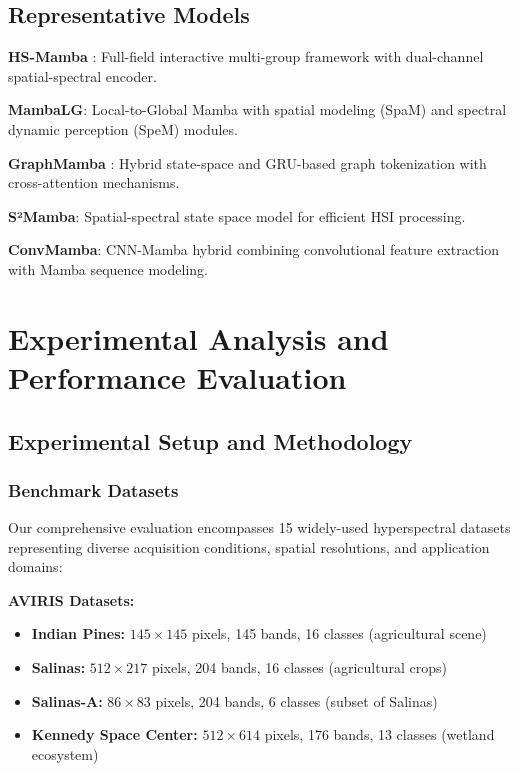 \documentclass[journal]{IEEEtran}
\begin{document}
\subsection{Representative Models}

\textbf{HS-Mamba} \cite{zhu2024mambahsi}: Full-field interactive multi-group framework with dual-channel spatial-spectral encoder.

\textbf{MambaLG}: Local-to-Global Mamba with spatial modeling (SpaM) and spectral dynamic perception (SpeM) modules.

\textbf{GraphMamba} \cite{ahmad2021graphmamba}: Hybrid state-space and GRU-based graph tokenization with cross-attention mechanisms.

\textbf{S²Mamba}: Spatial-spectral state space model for efficient HSI processing.

\textbf{ConvMamba}: CNN-Mamba hybrid combining convolutional feature extraction with Mamba sequence modeling.





\section{Experimental Analysis and Performance Evaluation}

\subsection{Experimental Setup and Methodology}

\subsubsection{Benchmark Datasets}

Our comprehensive evaluation encompasses 15 widely-used hyperspectral datasets representing diverse acquisition conditions, spatial resolutions, and application domains:

\textbf{AVIRIS Datasets:}
\begin{itemize}
\item \textbf{Indian Pines:} $145 \times 145$ pixels, 145 bands, 16 classes (agricultural scene)
\item \textbf{Salinas:} $512 \times 217$ pixels, 204 bands, 16 classes (agricultural crops)
\item \textbf{Salinas-A:} $86 \times 83$ pixels, 204 bands, 6 classes (subset of Salinas)
\item \textbf{Kennedy Space Center:} $512 \times 614$ pixels, 176 bands, 13 classes (wetland ecosystem)
\end{itemize}
\end{document}
